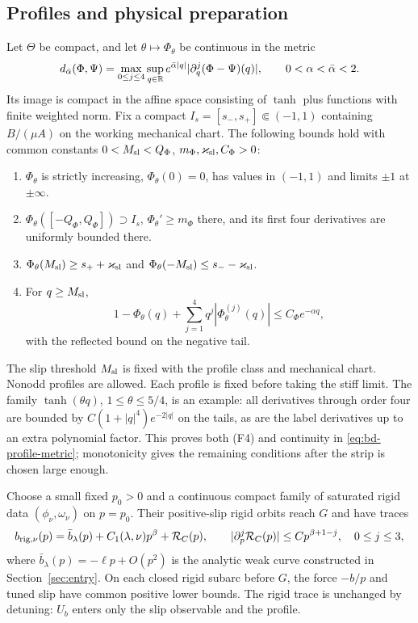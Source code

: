 \subsection{Profiles and physical preparation}
Let $\Theta$ be compact, and let $\theta\mapsto\Phi_\theta$ be
continuous in the metric
\begin{equation}
 d_{\bar\alpha}(\Phi,\Psi)=
 \max_{0\le j\le4}\sup_{q\in\mathbb R}
 e^{\bar\alpha|q|}|\partial_q^j(\Phi-\Psi)(q)|,
 \qquad 0<\alpha<\bar\alpha<2.
 \label{eq:bd-profile-metric}
\end{equation}
Its image is compact in the affine space consisting of $\tanh$ plus
functions with finite weighted norm. Fix a compact
$I_s=[s_-,s_+]\Subset(-1,1)$ containing $B/(\mu A)$ on the
working mechanical chart. The following bounds hold with common
constants $0<M_{\rm sl}<Q_\Phi$, $m_\Phi,\varkappa_{\rm sl},C_\Phi>0$:
\begin{enumerate}[label=\textup{(F\arabic*)}]
\item $\Phi_\theta$ is strictly increasing, $\Phi_\theta(0)=0$,
 has values in $(-1,1)$ and limits $\pm1$ at $\pm\infty$.
\item $\Phi_\theta([-Q_\Phi,Q_\Phi])\supset I_s$,
 $\Phi_\theta'\ge m_\Phi$ there, and its first four derivatives
 are uniformly bounded there.
\item $\Phi_\theta(M_{\rm sl})\ge s_++\varkappa_{\rm sl}$ and
 $\Phi_\theta(-M_{\rm sl})\le s_--\varkappa_{\rm sl}$.
\item For $q\ge M_{\rm sl}$,
 \[
 1-\Phi_\theta(q)+\sum_{j=1}^4q^j|\Phi_\theta^{(j)}(q)|
                 \le C_\Phi e^{-\alpha q},
 \]
 with the reflected bound on the negative tail.
\end{enumerate}
The slip threshold $M_{\rm sl}$ is fixed with the profile class and
mechanical chart.
Nonodd profiles are allowed. Each profile is fixed before taking
the stiff limit. The family $\tanh(\theta q)$, $1\le\theta\le5/4$,
is an example: all derivatives through order four are bounded by
$C(1+|q|^4)e^{-2|q|}$ on the tails, as are the label derivatives
up to an extra polynomial factor. This proves both (F4) and
continuity in \eqref{eq:bd-profile-metric}; monotonicity gives the
remaining conditions after the strip is chosen large enough.

Choose a small fixed $p_0>0$ and a continuous compact family of
saturated rigid data $(\phi_\nu,\omega_\nu)$ on $p=p_0$.
Their positive-slip rigid orbits reach $G$ and have traces
\begin{equation}
 b_{{\rm rig},\nu}(p)=\bar b_\lambda(p)+C_1(\lambda,\nu)p^\beta
                 +\mathcal R_C(p),\qquad
 |\partial_p^j\mathcal R_C(p)|\le Cp^{\beta+1-j},\quad 0\le j\le3,
 \label{eq:bd-prescribed-trace}
\end{equation}
where $\bar b_\lambda(p)=-\ell p+O(p^2)$ is the analytic weak
curve constructed in Section~\ref{sec:entry}.
On each closed rigid subarc before $G$, the force $-b/p$ and tuned
slip have common positive lower bounds. The rigid trace is unchanged
by detuning: $U_b$ enters only the slip observable and the profile.

